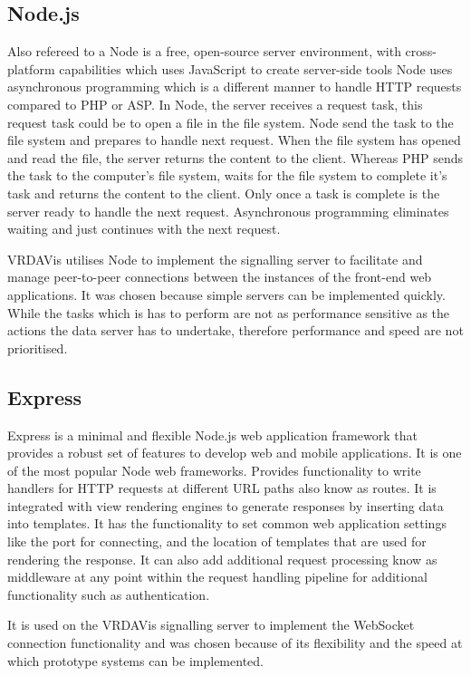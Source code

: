 \subsection{Node.js}
Also refereed to a Node is a free, open-source server environment, with cross-platform capabilities which uses JavaScript to create server-side tools
Node uses asynchronous programming which is a different manner to handle HTTP requests compared to PHP or ASP.
In Node, the server receives a request task, this request task could be to open a file in the file system. 
Node send the task to the file system and prepares to handle next request. 
When the file system has opened and read the file, the server returns the content to the client.
Whereas PHP sends the task to the computer's file system, waits for the file system to complete it's task and returns the content to the client. 
Only once a task is complete is the server ready to handle the next request.
Asynchronous programming eliminates waiting and just continues with the next request.

VRDAVis utilises Node to implement the signalling server to facilitate and manage peer-to-peer connections between the instances of the front-end web applications.
It was chosen because simple servers can be implemented quickly.
While the tasks which is has to perform are not as performance sensitive as the actions the data server has to undertake, therefore performance and speed are not prioritised.

\subsection{Express}
Express is a minimal and flexible Node.js web application framework that provides a robust set of features to develop web and mobile applications.
It is one of the most popular Node web frameworks.
Provides functionality to write handlers for HTTP requests at different URL paths also know as routes.
It is integrated with view rendering engines to generate responses by inserting data into templates.
It has the functionality to set common web application settings like the port for connecting, and the location of templates that are used for rendering the response.
It can also add additional request processing know as middleware at any point within the request handling pipeline for additional functionality such as authentication.

It is used on the VRDAVis signalling server to implement the WebSocket connection functionality and was chosen because of its flexibility and the speed at which prototype systems can be implemented.

